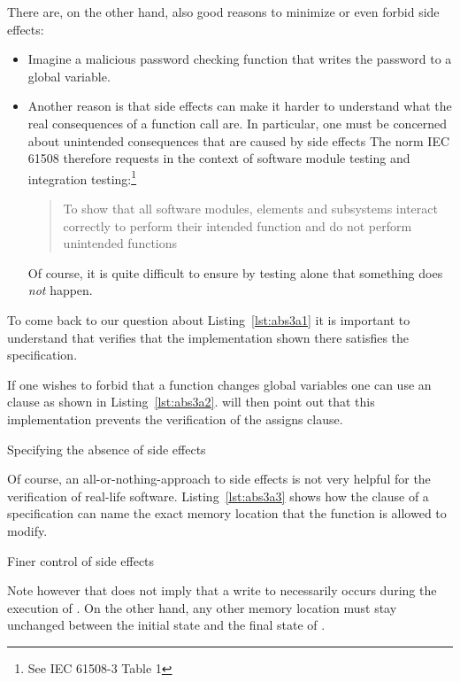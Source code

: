 \clearpage

There are, on the other hand, also good reasons to minimize or even forbid side 
effects:

\begin{itemize}
\item
Imagine a malicious password checking function that writes the password to
a global variable.

\item
Another reason is that side effects can make it harder to understand what 
the real consequences of a function call are.
In particular, one must be concerned about unintended consequences that
are caused by side effects
The norm IEC 61508 therefore requests in the context of software module testing
and integration testing:\footnote{%
   See IEC 61508-3 Table 1
}

\begin{quote}
To show that all software modules,
elements and subsystems interact correctly
to perform their intended function and do not perform unintended functions
\end{quote}

Of course, it is quite difficult to ensure by testing alone that something does \emph{not} happen.
\end{itemize}

To come back to our question about Listing~\ref{lst:abs3a1} it is important
to understand that \framacwp verifies that the implementation shown there
satisfies the specification.

If one wishes to forbid that a function changes global variables
one can use an  clause as shown in Listing~\ref{lst:abs3a2}.
\framacwp will then point out that this implementation prevents
the verification of the assigns clause.

\begin{listing}[hbt]
\begin{minipage}{\textwidth}

\end{minipage}
\caption{\label{lst:abs3a2} Specifying the absence of side effects}
\end{listing}


\clearpage

Of course, an all-or-nothing-approach to side effects is not very helpful
for the verification of real-life software.
Listing~\ref{lst:abs3a3} shows how the  clause of a
specification can name the exact memory location that the
function is allowed to modify.

\begin{listing}[hbt]
\begin{minipage}{\textwidth}

\end{minipage}
\caption{\label{lst:abs3a3} Finer control of side effects}
\end{listing}

Note however that  does not imply that a write to 
necessarily occurs during the execution of . On the other hand, any
other memory location must stay unchanged between the initial state
and the final state of .

